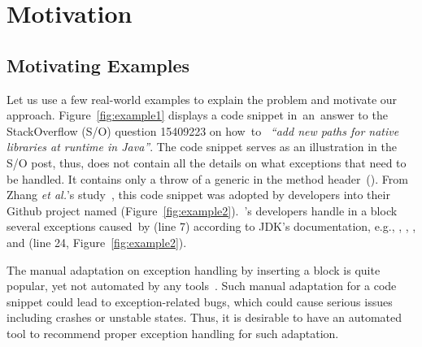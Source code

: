 \section{Motivation}
\label{motiv:sec}

\subsection{Motivating Examples}
\label{examples:sec}



Let us use a few real-world examples to explain the problem and
motivate our approach. Figure~\ref{fig:example1} displays a code
snippet in~an~answer to the StackOverflow (S/O) question 15409223 on
how~to~ {\em ``add new paths for native libraries at runtime in
  Java''}.  The code snippet serves as an illustration in the S/O
post, thus, does not contain all the details on what exceptions that
need to be handled. It contains only a throw of a generic
 in the method header~(). From
Zhang {\em et al.}'s study~\cite{zhang-icse19}, this code snippet was
adopted by developers into their Github project named 
(Figure~\ref{fig:example2}).~'s developers handle in a
 block several exceptions caused~by
 (line 7)
according to JDK's documentation, e.g.,
, ,
, and
 (line 24,
Figure~\ref{fig:example2}).

The manual adaptation on exception handling by inserting a
 block is quite popular, yet not automated by any
tools~\cite{zhang-icse19}. Such manual adaptation for a code snippet
could lead to exception-related bugs, which could cause serious issues
including crashes or unstable states.
Thus, it is desirable to have an automated tool to recommend proper
exception handling for such adaptation.


